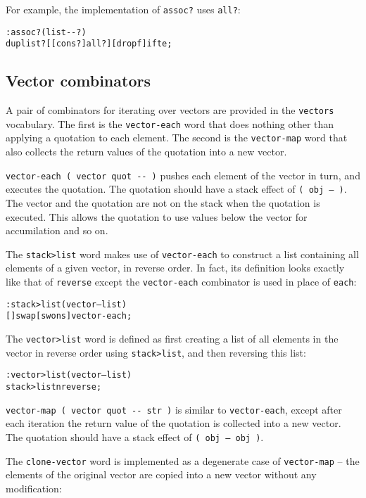 \documentclass[english]{article}
\begin{document}
For example, the implementation of \texttt{assoc?} uses \texttt{all?}:

\begin{alltt}
: assoc? ( list -{}- ? )
    dup list? {[} {[} cons? {]} all? {]} {[} drop f {]} ifte ;
\end{alltt}

\subsection{Vector combinators}

A pair of combinators for iterating over vectors are provided in the \texttt{vectors} vocabulary. The first is the \texttt{vector-each} word that does nothing other than applying a quotation to each element. The second is the \texttt{vector-map} word that also collects the return values of the quotation into a new vector.

\texttt{vector-each ( vector quot -{}- )} pushes each element of the vector in turn, and executes the quotation. The quotation should have a stack effect of \texttt{( obj -- )}. The vector and the quotation are not on the stack when the quotation is executed. This allows the quotation to use values below the vector for accumilation and so on.

The \texttt{stack>list} word makes use of \texttt{vector-each} to construct a list containing all elements of a given vector, in reverse order. In fact, its definition looks exactly like that of \texttt{reverse} except the \texttt{vector-each} combinator is used in place of \texttt{each}:

\begin{alltt}
: stack>list ( vector -- list )
    {[} {]} swap {[} swons {]} vector-each ;
\end{alltt}

The \texttt{vector>list} word is defined as first creating a list of all elements in the vector in reverse order using \texttt{stack>list}, and then reversing this list:

\begin{alltt}
: vector>list ( vector -- list )
    stack>list nreverse ;
\end{alltt}

\texttt{vector-map ( vector quot -{}- str )} is similar to \texttt{vector-each}, except after each iteration the return value of the quotation is collected into a new vector. The quotation should have a stack effect of \texttt{( obj -- obj )}.

The \texttt{clone-vector} word is implemented as a degenerate case of \texttt{vector-map} -- the elements of the original vector are copied into a new vector without any modification:
\end{document}
